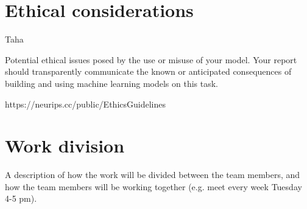 \documentclass{article}
\begin{document}







\section{Ethical considerations}
Taha

Potential ethical issues posed by the use or misuse of
your model. Your report should transparently
communicate the known or anticipated consequences
of building and using machine learning models on this
task.

https://neurips.cc/public/EthicsGuidelines


\section{Work division}

A description of how the work will be divided between
the team members, and how the team members will be
working together (e.g. meet every week Tuesday 4-5
pm).
\end{document}
